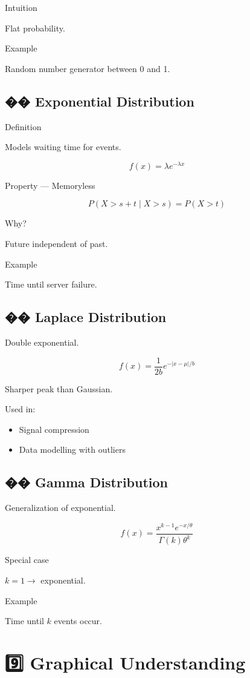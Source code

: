 \documentclass[12pt,a4paper]{article}
\begin{document}
Intuition

Flat probability.

Example

Random number generator between 0 and 1.

\subsection*{�� Exponential Distribution}

Definition

Models waiting time for events.

\[
f(x) = \lambda e^{-\lambda x}
\]

Property — Memoryless

\[
P(X > s+t \mid X > s) = P(X > t)
\]

Why?

Future independent of past.

Example

Time until server failure.

\subsection*{�� Laplace Distribution}

Double exponential.

\[
f(x) = \frac{1}{2b} e^{-|x-\mu|/b}
\]

Sharper peak than Gaussian.

Used in:

\begin{itemize}
\item Signal compression
\item Data modelling with outliers
\end{itemize}

\subsection*{�� Gamma Distribution}

Generalization of exponential.

\[
f(x) = \frac{x^{k-1} e^{-x/\theta}}{\Gamma(k)\theta^k}
\]

Special case

$k = 1 \rightarrow$ exponential.

Example

Time until $k$ events occur.

\section*{9️⃣ Graphical Understanding}
\end{document}
